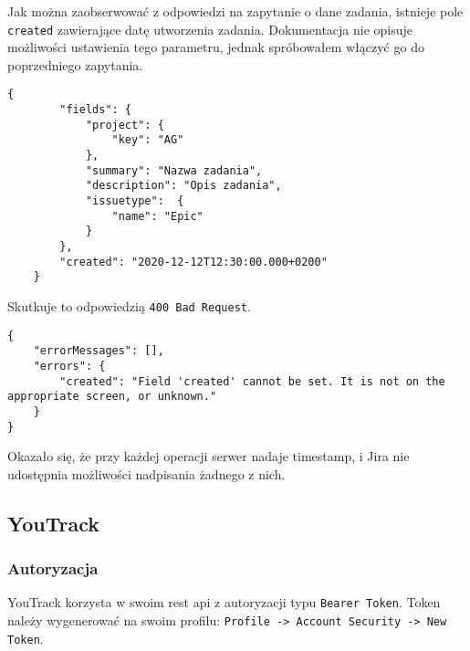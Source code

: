 Jak można zaobserwować z odpowiedzi na zapytanie o dane zadania, istnieje pole \texttt{created} zawierające datę utworzenia zadania.
Dokumentacja nie opisuje możliwości ustawienia tego parametru, jednak spróbowałem włączyć go do poprzedniego zapytania.
\begin{lstlisting}[caption=Próba ustawienia daty stworzenia zadania (Jira)]
    {
        "fields": {
            "project": {
                "key": "AG"
            },
            "summary": "Nazwa zadania",
            "description": "Opis zadania",
            "issuetype":  {
                "name": "Epic"
            }
        },
        "created": "2020-12-12T12:30:00.000+0200"
    }
\end{lstlisting}
Skutkuje to odpowiedzią \texttt{400 Bad Request}.
\begin{lstlisting}[caption=Odpowiedź na próbę ręcznego ustawienia daty utworzenia zadania (Jira)]
{
    "errorMessages": [],
    "errors": {
        "created": "Field 'created' cannot be set. It is not on the appropriate screen, or unknown."
    }
}
\end{lstlisting}
Okazało się, że przy każdej operacji serwer nadaje timestamp, i Jira nie udostępnia możliwości nadpisania żadnego z nich.

\subsection*{YouTrack}
\subsubsection*{Autoryzacja}
YouTrack korzysta w swoim rest api z autoryzacji typu \texttt{Bearer Token}.
Token należy wygenerować na swoim profilu: \texttt{Profile -> Account Security -> New Token}.
